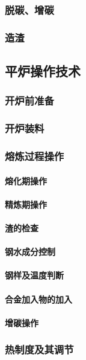 \documentclass[UTF8]{../../ApplicationUniverse}
\begin{document}
        \subsubsection{脱碳、增碳}
        \subsubsection{造渣}
    \subsection{平炉操作技术}
        \subsubsection{开炉前准备}
        \subsubsection{开炉装料}
        \subsubsection{熔炼过程操作}
            \paragraph{熔化期操作}
            \paragraph{精炼期操作}
            \paragraph{渣的检查}
            \paragraph{钢水成分控制}
            \paragraph{钢样及温度判断}
            \paragraph{合金加入物的加入}
            \paragraph{增碳操作}
        \subsubsection{热制度及其调节}
\end{document}
